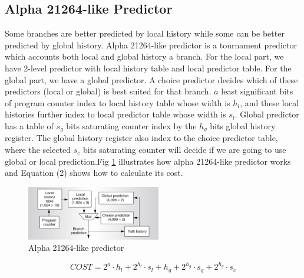 \documentclass[conference]{IEEEtran}
\begin{document}
\subsection{Alpha 21264-like Predictor}
	Some branches are better predicted by local history while some can be better predicted by global history. Alpha 21264-like predictor is a tournament predictor which accounts both local and global history a branch. For the local part, we have 2-level predictor with local history table and local predictor table. For the global part, we have a global predictor. A choice predictor decides which of these predictors (local or global) is best suited for that branch. $a$ least significant bits of program counter index to local history table whose width is $h_l$, and these local histories further index to local predictor table whose width is $s_l$. Global predictor has a table of $s_g$ bits saturating counter index by the $h_g$ bits global history register. The global history register also index to the choice predictor table, where the selected $s_c$ bits saturating counter will decide if we are going to use global or local prediction.Fig \ref{alpha_diagram} illustrates how alpha 21264-like predictor works and Equation (2) shows how to calculate its cost.
\begin{figure}[!t]
        \centering
        \includegraphics[width=2.3in]{alpha_diagram}
        \caption{Alpha 21264-like predictor\cite{Alpha21264}}
        \label{alpha_diagram}
    \end{figure}
    
    \begin{equation}
    COST = 2^a \cdot h_l + 2^{h_l} \cdot s_l + h_g + 2^{h_g} \cdot s_g + 2^{h_g} \cdot s_c
    \end{equation}
    
\end{document}
